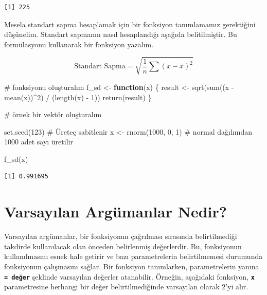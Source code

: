 \documentclass[
  letterpaper,
  DIV=11,
  numbers=noendperiod]{scrreprt}
\newenvironment{Shaded}{\begin{snugshade}}{\end{snugshade}}
\newcommand{\CommentTok}[1]{\textcolor[rgb]{0.37,0.37,0.37}{#1}}
\newcommand{\ControlFlowTok}[1]{\textcolor[rgb]{0.00,0.23,0.31}{\textbf{#1}}}
\newcommand{\DecValTok}[1]{\textcolor[rgb]{0.68,0.00,0.00}{#1}}
\newcommand{\FunctionTok}[1]{\textcolor[rgb]{0.28,0.35,0.67}{#1}}
\newcommand{\NormalTok}[1]{\textcolor[rgb]{0.00,0.23,0.31}{#1}}
\newcommand{\OtherTok}[1]{\textcolor[rgb]{0.00,0.23,0.31}{#1}}
\newcommand{\SpecialCharTok}[1]{\textcolor[rgb]{0.37,0.37,0.37}{#1}}
\begin{document}
\begin{verbatim}
[1] 225
\end{verbatim}

Mesela standart sapma hesaplamak için bir fonksiyon tanımlamamız
gerektiğini düşünelim. Standart sapmanın nasıl hesaplandığı aşağıda
belitilmiştir. Bu formülasyonu kullanarak bir fonksiyon yazalım.

\[\text{Standart Sapma} = \sqrt{\frac{1}{n} \sum{(x - \bar{x})^2}}\]

\begin{Shaded}
\begin{Highlighting}[]
\CommentTok{\# fonksiyonu oluşturalım}
\NormalTok{f\_sd }\OtherTok{\textless{}{-}} \ControlFlowTok{function}\NormalTok{(x) \{}
\NormalTok{  result }\OtherTok{\textless{}{-}} \FunctionTok{sqrt}\NormalTok{(}\FunctionTok{sum}\NormalTok{((x }\SpecialCharTok{{-}} \FunctionTok{mean}\NormalTok{(x))}\SpecialCharTok{\^{}}\DecValTok{2}\NormalTok{) }\SpecialCharTok{/}\NormalTok{ (}\FunctionTok{length}\NormalTok{(x) }\SpecialCharTok{{-}} \DecValTok{1}\NormalTok{))}
  \FunctionTok{return}\NormalTok{(result)}
\NormalTok{\}}

\CommentTok{\# örnek bir vektör oluşturalım}

\FunctionTok{set.seed}\NormalTok{(}\DecValTok{123}\NormalTok{) }\CommentTok{\# Üreteç sabitlenir}
\NormalTok{x }\OtherTok{\textless{}{-}} \FunctionTok{rnorm}\NormalTok{(}\DecValTok{1000}\NormalTok{, }\DecValTok{0}\NormalTok{, }\DecValTok{1}\NormalTok{) }\CommentTok{\# normal dağılımdan 1000 adet sayı üretilir}

\FunctionTok{f\_sd}\NormalTok{(x)}
\end{Highlighting}
\end{Shaded}

\begin{verbatim}
[1] 0.991695
\end{verbatim}

\section{\texorpdfstring{\textbf{Varsayılan Argümanlar
Nedir?}}{Varsayılan Argümanlar Nedir?}}\label{varsayux131lan-arguxfcmanlar-nedir}

Varsayılan argümanlar, bir fonksiyonun çağrılması sırasında
belirtilmediği takdirde kullanılacak olan önceden belirlenmiş
değerlerdir. Bu, fonksiyonun kullanılmasını esnek hale getirir ve bazı
parametrelerin belirtilmemesi durumunda fonksiyonun çalışmasını sağlar.
Bir fonksiyon tanımlarken, parametrelerin yanına
\textbf{\texttt{=\ değer}} şeklinde varsayılan değerler atanabilir.
Örneğin, aşağıdaki fonksiyon, \textbf{\texttt{x}} parametresine herhangi
bir değer belirtilmediğinde varsayılan olarak 2'yi alır.
\end{document}
